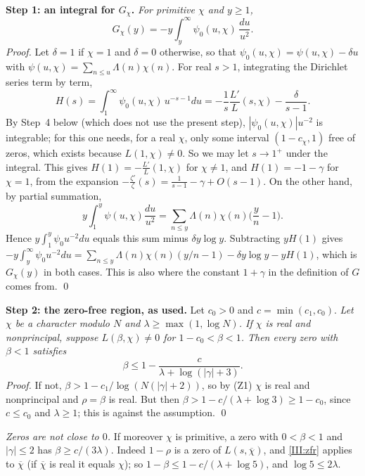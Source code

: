\documentclass[11pt,letterpaper]{article}
\begin{document}
\textbf{Step 1: an integral for $G_\chi$.} \emph{For primitive $\chi$ and $y\ge1$,}
\begin{equation}\label{III:int}
 G_\chi(y)=-y\int_y^\infty\psi_0(u,\chi)\,\frac{du}{u^2}.
\end{equation}
\emph{Proof.} Let $\delta=1$ if $\chi=1$ and $\delta=0$ otherwise, so that
$\psi_0(u,\chi)=\psi(u,\chi)-\delta u$ with $\psi(u,\chi)=\sum_{n\le u}\Lambda(n)\chi(n)$. For real $s>1$,
integrating the Dirichlet series term by term,
\begin{equation}\label{D:134}
 H(s)=\int_1^\infty\psi_0(u,\chi)\,u^{-s-1}du=-\frac1s\frac{L'}{L}(s,\chi)-\frac{\delta}{s-1}.
\end{equation}
By Step~4 below (which does not use the present step), $|\psi_0(u,\chi)|u^{-2}$ is integrable; for this one
needs, for a real $\chi$, only some interval $(1-c_\chi,1)$ free of zeros, which exists because
$L(1,\chi)\ne0$. So we may let $s\to1^+$ under the integral. This gives $H(1)=-\frac{L'}L(1,\chi)$ for
$\chi\ne1$, and $H(1)=-1-\gamma$ for $\chi=1$, from the expansion
$-\frac{\zeta'}\zeta(s)=\frac1{s-1}-\gamma+O(s-1)$. On the other hand, by partial summation,
\begin{equation}\label{D:135}
 y\int_1^y\psi(u,\chi)\frac{du}{u^2}=\sum_{n\le y}\Lambda(n)\chi(n)\Big(\frac yn-1\Big).
\end{equation}
Hence $y\int_1^y\psi_0u^{-2}du$ equals this sum minus $\delta y\log y$. Subtracting $yH(1)$ gives
$-y\int_y^\infty\psi_0u^{-2}du=\sum_{n\le y}\Lambda(n)\chi(n)(y/n-1)-\delta y\log y-yH(1)$, which is
$G_\chi(y)$ in both cases. This is also where the constant $1+\gamma$ in the definition of $G$ comes
from. \qed

\textbf{Step 2: the zero-free region, as used.} Let $c_0>0$ and $c=\min(c_1,c_0)$. \emph{Let $\chi$ be a
character modulo $N$ and $\lambda\ge\max(1,\log N)$. If $\chi$ is real and nonprincipal, suppose
$L(\beta,\chi)\ne0$ for $1-c_0<\beta<1$. Then every zero with $\beta<1$ satisfies}
\begin{equation}\label{III:zfr}
 \beta\le1-\frac{c}{\lambda+\log(|\gamma|+3)} .
\end{equation}
\emph{Proof.} If not, $\beta>1-c_1/\log(N(|\gamma|+2))$, so by (Z1) $\chi$ is real and nonprincipal and
$\rho=\beta$ is real. But then $\beta>1-c/(\lambda+\log3)\ge1-c_0$, since $c\le c_0$ and $\lambda\ge1$; this is against the assumption. \qed

\emph{Zeros are not close to $0$.} If moreover $\chi$ is primitive, a zero with $0<\beta<1$ and $|\gamma|\le2$
has $\beta\ge c/(3\lambda)$. Indeed $1-\rho$ is a zero of $L(s,\overline\chi)$, and \eqref{III:zfr} applies to
$\overline\chi$ (if $\overline\chi$ is real it equals $\chi$); so $1-\beta\le1-c/(\lambda+\log5)$, and
$\log5\le2\lambda$.
\end{document}
